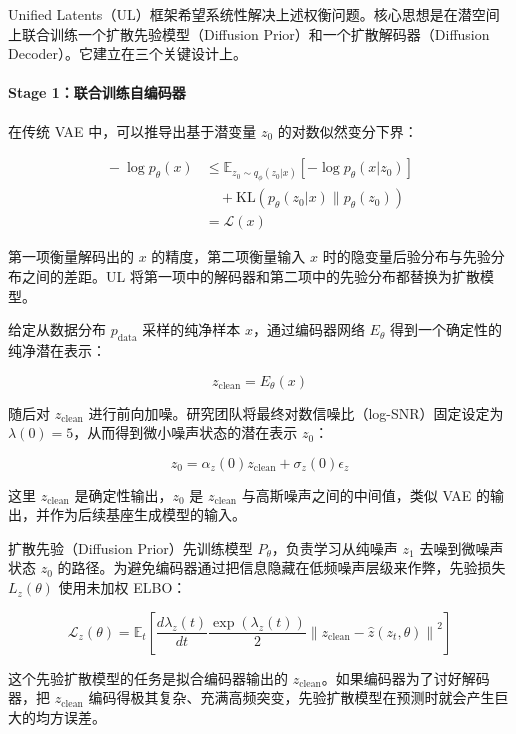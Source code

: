 Unified Latents（UL）框架希望系统性解决上述权衡问题。核心思想是在潜空间上联合训练一个扩散先验模型（Diffusion Prior）和一个扩散解码器（Diffusion Decoder）。它建立在三个关键设计上。

\hypertarget{stage-1ux8054ux5408ux8badux7ec3ux81eaux7f16ux7801ux5668}{%
\paragraph{Stage 1：联合训练自编码器}\label{stage-1ux8054ux5408ux8badux7ec3ux81eaux7f16ux7801ux5668}}

在传统 VAE 中，可以推导出基于潜变量 \(z_0\) 的对数似然变分下界：

\[
\begin{aligned}
{}-\log p_\theta(x)
&\le
\mathbb{E}_{z_0\sim q_\phi(z_0|x)}
\left[-\log p_\theta(x|z_0)\right]
\\
&\quad +
\mathrm{KL}(p_\theta(z_0|x)\|p_\theta(z_0))
\\
&=
\mathcal{L}(x)
\end{aligned}
\]

第一项衡量解码出的 \(x\) 的精度，第二项衡量输入 \(x\) 时的隐变量后验分布与先验分布之间的差距。UL 将第一项中的解码器和第二项中的先验分布都替换为扩散模型。

给定从数据分布 \(p_{\mathrm{data}}\) 采样的纯净样本 \(x\)，通过编码器网络 \(E_\theta\) 得到一个确定性的纯净潜在表示：

\[
z_{\mathrm{clean}}=E_\theta(x)
\]

随后对 \(z_{\mathrm{clean}}\) 进行前向加噪。研究团队将最终对数信噪比（log-SNR）固定设定为 \(\lambda(0)=5\)，从而得到微小噪声状态的潜在表示 \(z_0\)：

\[
z_0=\alpha_z(0)z_{\mathrm{clean}}+\sigma_z(0)\epsilon_z
\]

这里 \(z_{\mathrm{clean}}\) 是确定性输出，\(z_0\) 是 \(z_{\mathrm{clean}}\) 与高斯噪声之间的中间值，类似 VAE 的输出，并作为后续基座生成模型的输入。

扩散先验（Diffusion Prior）先训练模型 \(P_\theta\)，负责学习从纯噪声 \(z_1\) 去噪到微噪声状态 \(z_0\) 的路径。为避免编码器通过把信息隐藏在低频噪声层级来作弊，先验损失 \(L_z(\theta)\) 使用未加权 ELBO：

\[
\mathcal{L}_z(\theta)=
\mathbb{E}_t
\left[
\frac{d\lambda_z(t)}{dt}
\frac{\exp(\lambda_z(t))}{2}
\left\|
z_{\mathrm{clean}}-\hat{z}(z_t,\theta)
\right\|^2
\right]
\]

这个先验扩散模型的任务是拟合编码器输出的 \(z_{\mathrm{clean}}\)。如果编码器为了讨好解码器，把 \(z_{\mathrm{clean}}\) 编码得极其复杂、充满高频突变，先验扩散模型在预测时就会产生巨大的均方误差。

